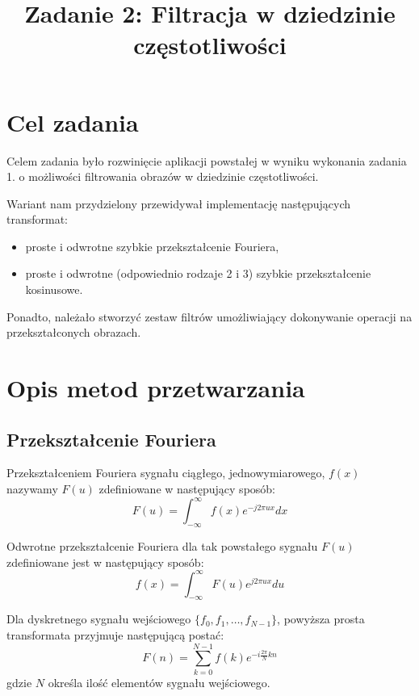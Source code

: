 \documentclass{classrep}
\author{%
  \studentinfo{Michał Janiszewski}{169485} \and
  \studentinfo{Michał Kawski}{169487}
}
\title{Zadanie 2: Filtracja w dziedzinie częstotliwości}
\begin{document}
\maketitle

\section{Cel zadania}
Celem zadania było rozwinięcie aplikacji powstałej w wyniku wykonania zadania 1. o możliwości filtrowania obrazów w dziedzinie częstotliwości.

Wariant nam przydzielony przewidywał implementację następujących transformat:
\begin{itemize}
 \item proste i odwrotne szybkie przekształcenie Fouriera,
 \item proste i odwrotne (odpowiednio rodzaje 2 i 3) szybkie przekształcenie kosinusowe.
\end{itemize}

Ponadto, należało stworzyć zestaw filtrów umożliwiający dokonywanie operacji na przekształconych obrazach.

\section{Opis metod przetwarzania}
\subsection{Przekształcenie Fouriera}
Przekształceniem Fouriera sygnału ciągłego, jednowymiarowego, $f(x)$ nazywamy $F(u)$ zdefiniowane w następujący sposób:
\begin{equation}
  F(u) = \int_{-\infty}^{\infty} f(x)e^{-j2\pi ux}dx
\end{equation}

Odwrotne przekształcenie Fouriera dla tak powstałego sygnału $F(u)$ zdefiniowane jest w następujący sposób:
\begin{equation}
  f(x) = \int_{-\infty}^{\infty}F(u) e^{j2\pi ux}du
\end{equation}

Dla dyskretnego sygnału wejściowego $\{f_0, f_1, \ldots, f_{N - 1}\}$, powyższa prosta transformata przyjmuje następującą postać:
\begin{equation}
  \label{eq.dft}
  F(n) = \displaystyle \sum_{k = 0}^{N - 1} f(k) e^{-i\frac{2\pi}{N}kn}
\end{equation}
gdzie $N$ określa ilość elementów sygnału wejściowego.
\end{document}
